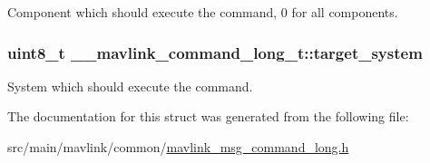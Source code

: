 Component which should execute the command, 0 for all components. 

\hypertarget{struct____mavlink__command__long__t_a705313e3359248c2e2b77d71b99a5d3d}{
\subsubsection[{target\+\_\+system}]{\setlength{\rightskip}{0pt plus 5cm}uint8\+\_\+t \+\_\+\+\_\+mavlink\+\_\+command\+\_\+long\+\_\+t\+::target\+\_\+system}}\label{struct____mavlink__command__long__t_a705313e3359248c2e2b77d71b99a5d3d}


System which should execute the command. 



The documentation for this struct was generated from the following file\+:\begin{DoxyCompactItemize}
\item 
src/main/mavlink/common/\hyperlink{mavlink__msg__command__long_8h}{mavlink\+\_\+msg\+\_\+command\+\_\+long.\+h}\end{DoxyCompactItemize}
